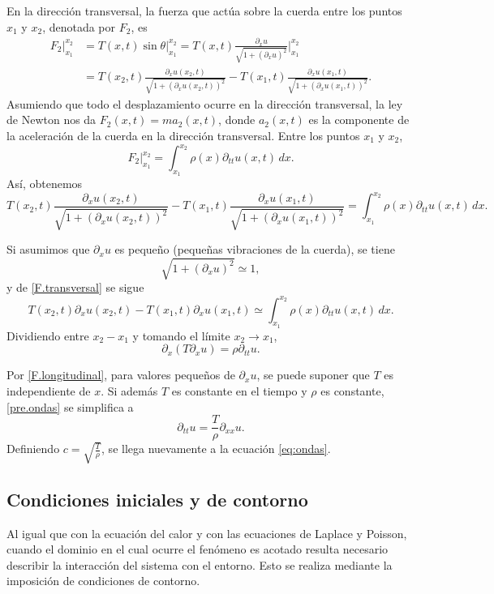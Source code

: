 \documentclass[12pt, a4paper]{amsbook}
\theoremstyle{remark}
\theoremstyle{definition}
\numberwithin{section}{chapter}
\numberwithin{subsection}{section}
\numberwithin{equation}{section}
\numberwithin{figure}{chapter}
\begin{document}
En la dirección transversal, la fuerza que actúa sobre la cuerda entre los puntos $x_1$ y $x_2$, denotada por $F_2$, es
\begin{align*}
F_2|_{x_1}^{x_2} &= T(x,t)\sin\theta \Big|_{x_1}^{x_2} = T(x,t) \frac{\partial_x u}{\sqrt{1 + (\partial_x u)^2}}\Big|_{x_1}^{x_2} \\
&= T(x_2,t) \frac{\partial_x u(x_2,t)}{\sqrt{1 + (\partial_x u(x_2,t))^2}} - T(x_1,t) \frac{\partial_x u(x_1,t)}{\sqrt{1 + (\partial_x u(x_1,t))^2}}.
\end{align*}
Asumiendo que todo el desplazamiento ocurre en la dirección transversal, la ley de Newton nos da $F_2(x,t) = m a_2(x,t)$, donde $a_2(x,t)$ es la componente de la aceleración de la cuerda en la dirección transversal. Entre los puntos $x_1$ y $x_2$,
\[
F_2|_{x_1}^{x_2} = \int_{x_1}^{x_2} \rho(x) \partial_{tt} u(x,t)\, dx.
\]
Así, obtenemos
\begin{equation}\label{F.transversal}
T(x_2,t) \frac{\partial_x u(x_2,t)}{\sqrt{1 + (\partial_x u(x_2,t))^2}} - T(x_1,t) \frac{\partial_x u(x_1,t)}{\sqrt{1 + (\partial_x u(x_1,t))^2}} = \int_{x_1}^{x_2} \rho(x) \partial_{tt} u(x,t)\, dx.
\end{equation}

Si asumimos que $\partial_x u$ es pequeño (pequeñas vibraciones de la cuerda), se tiene
\[
\sqrt{1 + (\partial_x u)^2} \simeq 1,
\]
y de \eqref{F.transversal} se sigue
\[
T(x_2,t) \partial_x u(x_2,t) - T(x_1,t) \partial_x u(x_1,t) \simeq \int_{x_1}^{x_2} \rho(x) \partial_{tt} u(x,t)\, dx.
\]
Dividiendo entre $x_2 - x_1$ y tomando el límite $x_2 \to x_1$,
\begin{equation}\label{pre.ondas}
\partial_x(T \partial_x u) = \rho \partial_{tt} u.
\end{equation}

Por \eqref{F.longitudinal}, para valores pequeños de $\partial_x u$, se puede suponer que $T$ es independiente de $x$. Si además $T$ es constante en el tiempo y $\rho$ es constante, \eqref{pre.ondas} se simplifica a
\[
\partial_{tt} u = \frac{T}{\rho} \partial_{xx} u.
\]
Definiendo $c = \sqrt{\frac{T}{\rho}}$, se llega nuevamente a la ecuación \eqref{eq:ondas}.

\subsection*{Condiciones iniciales y de contorno}

Al igual que con la ecuación del calor y con las ecuaciones de Laplace y Poisson, cuando el dominio en el cual ocurre el fenómeno es acotado resulta necesario describir la interacción del sistema con el entorno. Esto se realiza mediante la imposición de condiciones de contorno.
\end{document}
